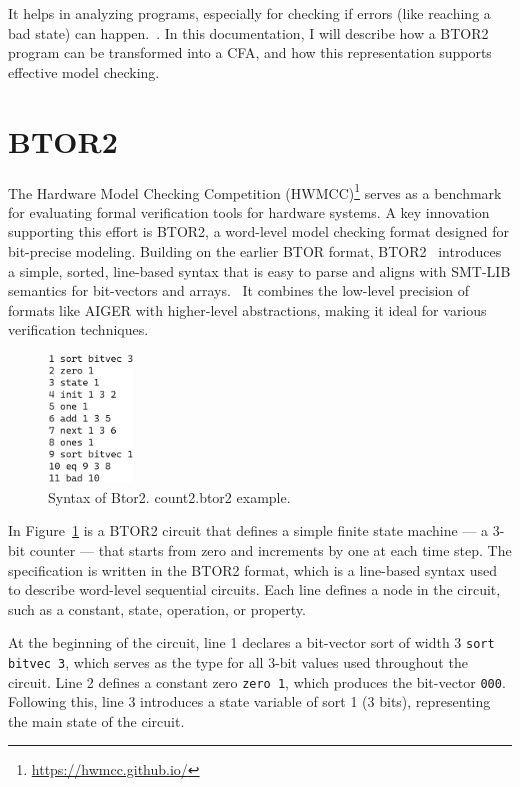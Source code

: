 It helps in analyzing programs, especially for checking if errors (like reaching a bad state) can happen.~\cite{cfa}. In this documentation, I will describe how a BTOR2 program can be transformed into a CFA, and how this representation supports effective model checking.

\section{BTOR2}
The Hardware Model Checking Competition (HWMCC)\footnote{\url{https://hwmcc.github.io/}} serves as a benchmark for evaluating formal verification tools for hardware systems. A key innovation supporting this effort is BTOR2, a word-level model checking format designed for bit-precise modeling. Building on the earlier BTOR format, BTOR2~\cite{btor2} introduces a simple, sorted, line-based syntax that is easy to parse and aligns with SMT-LIB semantics for bit-vectors and arrays.~\cite{SMT-LIB} It combines the low-level precision of formats like AIGER with higher-level abstractions, making it ideal for various verification techniques.~\cite{AIGER}

\begin{figure}[h]
  \centering
  \includegraphics[width=0.2\textwidth]{figures/count2.png}
  \caption{ Syntax of Btor2. count2.btor2 example. }
  \label{fig:count2}
\end{figure}

In Figure~\ref{fig:count2} is a BTOR2 circuit that defines a simple finite state machine — a 3-bit counter — that starts from zero and increments by one at each time step. The specification is written in the BTOR2 format, which is a line-based syntax used to describe word-level sequential circuits. Each line defines a node in the circuit, such as a constant, state, operation, or property.

At the beginning of the circuit, line 1 declares a bit-vector sort of width 3 \verb|sort bitvec 3|, which serves as the type for all 3-bit values used throughout the circuit. Line 2 defines a constant zero \verb|zero 1|, which produces the bit-vector \verb|000|. Following this, line 3 introduces a state variable of sort 1 (3 bits), representing the main state of the circuit.

